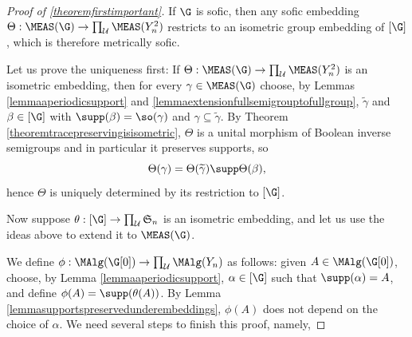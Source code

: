 \begin{proof}[Proof of \ref{theoremfirstimportant}]
If $\G$ is sofic, then any sofic embedding $\Theta:\MEAS(\G)\to\prod_\mathcal{U}\MEAS(Y_n^2)$ restricts to an isometric group embedding of $[\G]$, which is therefore metrically sofic.

Let us prove the uniqueness first: If $\Theta:\MEAS(\G)\to\prod_\mathcal{U}\MEAS(Y_n^2)$ is an isometric embedding, then for every $\gamma\in\MEAS(\G)$ choose, by Lemmas \ref{lemmaaperiodicsupport} and \ref{lemmaextensionfullsemigrouptofullgroup}, $\widetilde{\gamma}$ and $\beta\in [\G]$ with $\supp(\beta)=\so(\gamma)$ and $\gamma\subseteq\widetilde{\gamma}$. By Theorem \ref{theoremtracepreservingisisometric}, $\Theta$ is a unital morphism of Boolean inverse semigroups and in particular it preserves supports, so
\[\Theta(\gamma)=\Theta(\widetilde{\gamma})\supp\Theta(\beta),\]
hence $\Theta$ is uniquely determined by its restriction to $[\G]$.

Now suppose $\theta:[\G]\to\prod_\mathcal{U}\mathfrak{S}_n$ is an isometric embedding, and let us use the ideas above to extend it to $\MEAS(\G)$.

We define $\phi:\MAlg(\G[0])\to\prod_\mathcal{U}\MAlg(Y_n)$ as follows: given $A\in\MAlg(\G[0])$, choose, by Lemma \ref{lemmaaperiodicsupport}, $\alpha\in[\G]$ such that $\supp(\alpha)=A$, and define $\phi(A)=\supp(\theta(A))$. By Lemma \ref{lemmasupportspreservedunderembeddings}, $\phi(A)$ does not depend on the choice of $\alpha$. We need several steps to finish this proof, namely,


\end{proof}
